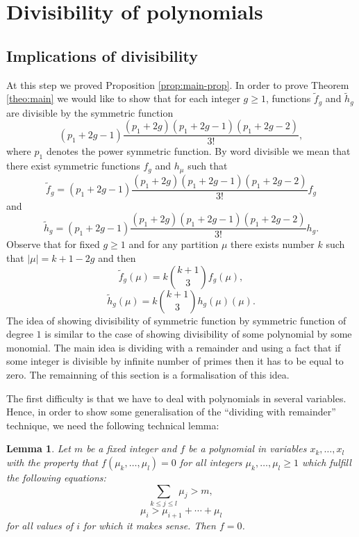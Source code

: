 \documentclass[12pt]{amsart}
\theoremstyle{plain}
\newtheorem{lemma}{Lemma}[section]
\theoremstyle{remark}
\begin{document}
\section{Divisibility of polynomials}
\label{sec:divisibility}

\subsection{Implications of divisibility}

At this step we proved Proposition \ref{prop:main-prop}. In order to
prove Theorem \ref{theo:main} we would like to show that for each integer $g
\geq 1$, functions $\tilde{f}_g$ and $\tilde{h}_g$ are divisible by the
symmetric function
$$(p_1 + 2g -1)\frac{(p_1 + 2g)(p_1 + 2g -1)(p_1 + 2g
-2)}{3!},$$ 
where $p_1$ denotes the power symmetric function. By word divisible
we mean that there exist symmetric functions $f_g$ and $h_\mu$
such that 
$$ \tilde{f}_g = (p_1 + 2g -1)\frac{(p_1 + 2g)(p_1 + 2g -1)(p_1 + 2g
-2)}{3!}f_g$$
and
$$ \tilde{h}_g = (p_1 + 2g -1)\frac{(p_1 + 2g)(p_1 + 2g -1)(p_1 + 2g
-2)}{3!}h_g.$$
Observe that for fixed $g \geq 1$ and for any partition $\mu$ there exists
number $k$ such that $|\mu| = k + 1 - 2g$ and then
$$ \tilde{f}_g(\mu) = k \binom{k+1}{3}f_g(\mu),$$
$$ \tilde{h}_g(\mu) = k \binom{k+1}{3}h_g(\mu)(\mu).$$
The idea of showing divisibility of symmetric function by symmetric function of
degree $1$ is similar to the case of showing divisibility of some polynomial by
some monomial. The main idea is dividing with a remainder and using a fact that
if some integer is divisible by infinite number of primes then it has to be
equal to zero. The remainning of this section is a formalisation of this idea.

The first difficulty is that we have to deal with polynomials in several
variables. Hence, in order to show some generalisation of the ``dividing with
remainder'' technique, we need the following technical lemma:

\begin{lemma}
\label{lem:zerozero}
Let $m$ be a fixed integer and $f$ be a polynomial in variables $x_k,\dots,x_l$
with the property that
$ f(\mu_k,\dots,\mu_l)=0$ for all integers $\mu_k,\dots,\mu_l\geq 1$ which
fulfill the following equations:
\begin{equation}
\label{eq:suma}
\sum_{k \leq j \leq l}\mu_j > m,
\end{equation}
\begin{equation}
\label{eq:wzrost}
\mu_i>\mu_{i+1}+\cdots+\mu_l
\end{equation}
for all values of $i$ for which it makes sense. Then $f=0$.
\end{lemma}
\end{document}
